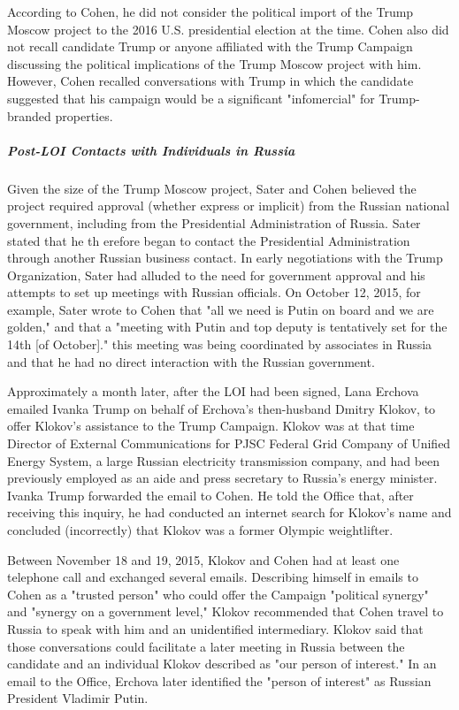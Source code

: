 According to Cohen, he did not consider the political import of the Trump Moscow project to the 2016 U.S. presidential election at the time.
Cohen also did not recall candidate Trump or anyone affiliated with the Trump Campaign discussing the political implications of the Trump Moscow project with him.
However, Cohen recalled conversations with Trump in which the candidate suggested that his campaign would be a significant "infomercial" for Trump-branded properties.

\subparagraph{Post-LOI Contacts with Individuals in Russia}

Given the size of the Trump Moscow project, Sater and Cohen believed the project required approval (whether express or implicit) from the Russian national government, including from the Presidential Administration of Russia.
Sater stated that he th erefore began to contact the Presidential Administration through another Russian business contact.
In early negotiations with the Trump Organization, Sater had alluded to the need for government approval and his attempts to set up meetings with Russian officials.
On October 12, 2015, for example, Sater wrote to Cohen that "all we need is Putin on board and we are golden," and that a "meeting with Putin and top deputy is tentatively set for the 14th [of October]."
 this meeting was being coordinated by associates in Russia and that he had no direct interaction with the Russian government.

Approximately a month later, after the LOI had been signed, Lana Erchova emailed Ivanka Trump on behalf of Erchova's then-husband Dmitry Klokov, to offer Klokov's assistance to the Trump Campaign.
Klokov was at that time Director of External Communications for PJSC Federal Grid Company of Unified Energy System, a large Russian electricity transmission company, and had been previously employed as an aide and press secretary to Russia's energy minister.
Ivanka Trump forwarded the email to Cohen.
He told the Office that, after receiving this inquiry, he had conducted an internet search for Klokov's name and concluded (incorrectly) that Klokov was a former Olympic weightlifter.

Between November 18 and 19, 2015, Klokov and Cohen had at least one telephone call and exchanged several emails.
Describing himself in emails to Cohen as a "trusted person" who could offer the Campaign "political synergy" and "synergy on a government level," Klokov recommended that Cohen travel to Russia to speak with him and an unidentified intermediary.
Klokov said that those conversations could facilitate a later meeting in Russia between the candidate and an individual Klokov described as "our person of interest."
In an email to the Office, Erchova later identified the "person of interest" as Russian President Vladimir Putin.

